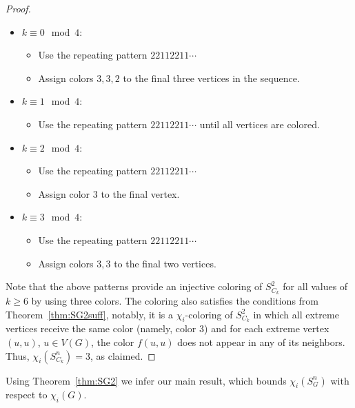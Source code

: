 \documentclass{article}
\begin{document}
\begin{proof}
\begin{itemize}[noitemsep]     
    \item $k\equiv 0 \mod 4$:
          \begin{itemize}[noitemsep]
              \item Use the repeating pattern $22112211 \cdots$ 
              \item Assign colors $3, 3, 2$ to the final three vertices in the sequence.
          \end{itemize}
    \item $k\equiv 1 \mod 4$:
          \begin{itemize}
              \item Use the repeating pattern $22112211 \cdots$ until all vertices are colored.
          \end{itemize}          
    \item $k\equiv 2 \mod 4$:
          \begin{itemize}[noitemsep]
              \item Use the repeating pattern $22112211 \cdots$ 
              \item Assign color $3$ to the final vertex.
          \end{itemize}  
    \item $k\equiv 3 \mod 4$:
          \begin{itemize}[noitemsep]
              \item Use the repeating pattern $22112211 \cdots$ 
              \item Assign colors $3, 3$ to the final two vertices.
          \end{itemize}  
\end{itemize}
Note that the above patterns provide an injective coloring of $S_{C_k}^2$ for all values of $k\ge 6$ by using three colors. The coloring also satisfies the conditions from Theorem~\ref{thm:SG2suff}, notably, it is a $\chi_i$-coloring of $S_{C_k}^2$ in which all extreme vertices receive the same color (namely, color $3$) and for each extreme vertex $(u,u)$, $u\in V(G)$, the color $f(u,u)$ does not appear in any of its neighbors. Thus, $\chi_i(S_{C_k}^n)=3$, as claimed.
\end{proof}

Using Theorem~\ref{thm:SG2} we infer our main result, which bounds $\chi_i(S_G^n)$ with respect to $\chi_i(G)$.
\end{document}
